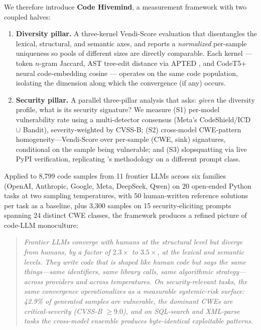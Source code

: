 \documentclass{article}
\begin{document}
We therefore introduce \textbf{Code Hivemind}, a measurement framework with
two coupled halves:

\begin{enumerate}[leftmargin=*]
  \item \textbf{Diversity pillar.} A three-kernel Vendi-Score evaluation
    \citep{friedman2023vendi} that disentangles the lexical, structural, and
    semantic axes, and reports a \emph{normalized} per-sample uniqueness so
    pools of different sizes are directly comparable. Each kernel --- token
    $n$-gram Jaccard, AST tree-edit distance via APTED
    \citep{pawlik2016apted}, and CodeT5+ \citep{wang2023codet5p} neural
    code-embedding cosine --- operates on the same code population, isolating
    the dimension along which the convergence (if any) occurs.
  \item \textbf{Security pillar.} A parallel three-pillar analysis that asks:
    \emph{given} the diversity profile, what is its security signature? We
    measure (S1) per-model vulnerability rate using a multi-detector
    consensus (Meta's CodeShield/ICD \citep{bhatt2023cyberseceval}
    $\cup$ Bandit), severity-weighted by CVSS-B; (S2) cross-model
    CWE-pattern homogeneity---Vendi-Score over per-sample (CWE, sink)
    signatures, conditional on the sample being vulnerable; and (S3)
    slopsquatting via live PyPI verification, replicating
    \citet{spracklen2025slopsquatting}'s methodology on a different prompt
    class.
\end{enumerate}

Applied to 8{,}799 code samples from 11 frontier LLMs across six
families (OpenAI, Anthropic, Google, Meta, DeepSeek, Qwen) on 20 open-ended
Python tasks at two sampling temperatures, with 50 human-written reference
solutions per task as a baseline, plus 3{,}300 samples on 15
security-eliciting prompts spanning 24 distinct CWE classes, the framework
produces a refined picture of code-LLM monoculture:

\begin{quote}
\itshape
Frontier LLMs converge with humans at the structural level but diverge from
humans, by a factor of $2.3\times$ to $3.5\times$, at the lexical and
semantic levels. They write code that is shaped like human code but says the
same things---same identifiers, same library calls, same algorithmic
strategy---across providers and across temperatures. On security-relevant
tasks, the same convergence operationalizes as a measurable systemic-risk
surface: 42.9\% of generated samples are vulnerable, the dominant CWEs are
critical-severity (CVSS-B $\ge 9.0$), and on SQL-search and XML-parse tasks
the cross-model ensemble produces byte-identical exploitable patterns.
\end{quote}
\end{document}

